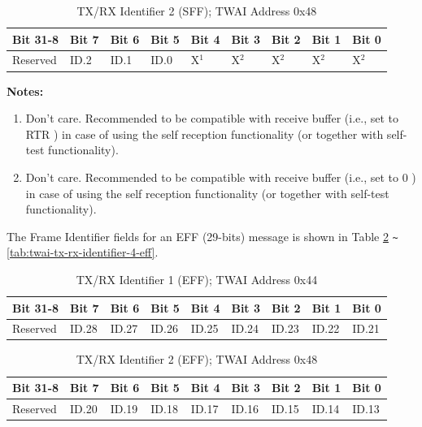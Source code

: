 \documentclass[main\_\_EN.tex]{subfiles}
\begin{document}
\begin{longtable}[c]{|p{1.4cm}|p{1.4cm}|p{1.4cm}|p{1.4cm}|p{1.4cm}|p{1.4cm}|p{1.4cm}|p{1.4cm}|p{1.4cm}|}
    \caption{TX/RX Identifier 2 (SFF); TWAI Address 0x48}
    \label{tab:twai-tx-rx-identifier-2-sff}\\
    \hline
       \rowcolor{lightgray}
    \textbf{Bit 31-8} & \textbf{Bit 7} & \textbf{Bit 6} & \textbf{Bit 5} & \textbf{Bit 4} & \textbf{Bit 3} & \textbf{Bit 2} & \textbf{Bit 1} & \textbf{Bit 0}\\\hline
    Reserved & ID.2 & ID.1 & ID.0 & X$^1$ & X$^2$ & X$^2$ & X$^2$ & X$^2$\\
    \hline
\end{longtable}
\vspace{-1.5em}
{\bfseries Notes:}\\
\begin{enumerate}
    \item Don’t care. Recommended to be compatible with receive buffer (i.e., set to RTR ) in case of using the self reception functionality (or together with self-test functionality).
    \item Don’t care. Recommended to be compatible with receive buffer (i.e., set to 0 ) in case of using the self reception functionality (or together with self-test functionality). 
\end{enumerate}


The Frame Identifier fields for an EFF (29-bits) message is shown in Table \ref{tab:twai-tx-rx-identifier-1-eff} \verb+~+ \ref{tab:twai-tx-rx-identifier-4-eff}.

\begin{longtable}[c]{|p{1.4cm}|p{1.4cm}|p{1.4cm}|p{1.4cm}|p{1.4cm}|p{1.4cm}|p{1.4cm}|p{1.4cm}|p{1.4cm}|}
    \caption{TX/RX Identifier 1 (EFF); TWAI Address 0x44}
    \label{tab:twai-tx-rx-identifier-1-eff}\\
    \hline
       \rowcolor{lightgray}
    \textbf{Bit 31-8} & \textbf{Bit 7} & \textbf{Bit 6} & \textbf{Bit 5} & \textbf{Bit 4} & \textbf{Bit 3} & \textbf{Bit 2} & \textbf{Bit 1} & \textbf{Bit 0}\\\hline
    Reserved & ID.28 & ID.27 & ID.26 & ID.25 & ID.24 & ID.23 & ID.22 & ID.21\\
    \hline
\end{longtable}

\begin{longtable}[c]{|p{1.4cm}|p{1.4cm}|p{1.4cm}|p{1.4cm}|p{1.4cm}|p{1.4cm}|p{1.4cm}|p{1.4cm}|p{1.4cm}|}
    \caption{TX/RX Identifier 2 (EFF); TWAI Address 0x48}
    \label{tab:twai-tx-rx-identifier-2-eff}\\
    \hline
       \rowcolor{lightgray}
    \textbf{Bit 31-8} & \textbf{Bit 7} & \textbf{Bit 6} & \textbf{Bit 5} & \textbf{Bit 4} & \textbf{Bit 3} & \textbf{Bit 2} & \textbf{Bit 1} & \textbf{Bit 0}\\\hline
    Reserved & ID.20 & ID.19 & ID.18 & ID.17 & ID.16 & ID.15 & ID.14 & ID.13\\
    \hline
\end{longtable}
\end{document}
